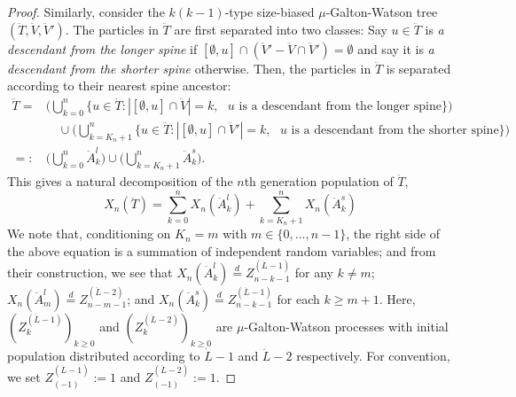 \documentclass[12pt,a4paper]{amsart}
\numberwithin{equation}{section}
\begin{document}
\begin{proof}
	Similarly, consider the $k(k-1)$-type size-biased $\mu$-Galton-Watson tree $(\ddot T,\ddot V,\ddot V')$.
	The particles in $\ddot T$ are first separated into two classes: Say $u \in \ddot T$ is \emph{a descendant from the longer spine} if $[\emptyset , u] \cap (\ddot V' - \ddot V \cap \ddot V') = \emptyset$ and say it is \emph{a descendant from the shorter spine} otherwise.
	Then, the particles in $\ddot T$ is separated according to their nearest spine ancestor:
\begin{equation*}\begin{split}
	\ddot T
	=&\Big( \bigcup_{k=0}^n \{u\in\ddot T: | [\emptyset, u]\cap \ddot V | = k, \text{ $u$ is a descendant from the longer spine}\} \Big)
	\\&\quad \cup \Big( \bigcup_{k= K_n+1}^n \{u\in\ddot T: | [\emptyset, u]\cap \ddot V' | = k, \text{ $u$ is a descendant from the shorter spine}\}  \Big)
	\\=:& 	\Big ( \bigcup_{k=0}^n \ddot A^l_k\Big)  \cup \Big( \bigcup_{k=K_n+1}^n \ddot A^s_k \Big).
\end{split}\end{equation*}
	This gives a natural decomposition of the $n$th generation population of $\ddot T$,
\begin{equation}\label{eq:rawtwospinedecomposition}
		X_n(\ddot T)
	=
		\sum_{k=0}^nX_n(\ddot A^l_k) + \sum_{k=K_n + 1}^n X_n(\ddot A^s_k)
\end{equation}
	We note that, conditioning on $K_n = m$ with $m\in\{0,\dots,n-1\}$, the right side of the above equation is a summation of independent random variables; and from their construction, we see that
	$X_n(\ddot A^l_k) \overset{d}{=} Z^{(\dot L - 1)}_{n-k-1}$ for any $k \neq m$;
	$X_n(\ddot A^l_m) \overset{d}{=} Z^{(\ddot L - 2)}_{n-m-1}$;
	and $X_n(\ddot A^s_k) \overset{d}{=} Z^{(\dot L - 1)}_{n-k-1}$ for each $k \geq m+1$.
	Here, $(Z^{(\dot L - 1)}_k)_{k\ge 0}$ and $(Z^{(\ddot L - 2)}_k)_{k\ge 0}$ are $\mu$-Galton-Watson processes with initial population distributed according to $\dot L-1$ and $\ddot L-2$ respectively.
	For convention, we set $Z^{(\dot L - 1)}_{(-1)}:= 1$ and $Z^{(\ddot L - 2)}_{(-1)}:= 1$.


\end{proof}
\end{document}
